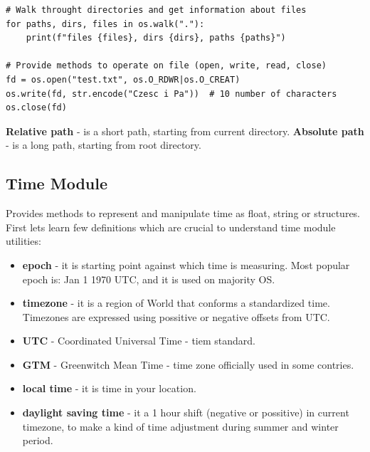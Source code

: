 \documentclass{article}
\begin{document}
\begin{lstlisting}[style=pystyle]
# Walk throught directories and get information about files
for paths, dirs, files in os.walk("."):
    print(f"files {files}, dirs {dirs}, paths {paths}")

# Provide methods to operate on file (open, write, read, close)
fd = os.open("test.txt", os.O_RDWR|os.O_CREAT)
os.write(fd, str.encode("Czesc i Pa"))	# 10 number of characters
os.close(fd)

\end{lstlisting}

\textbf{Relative path} - is a short path, starting from current directory. \textbf{Absolute path} - is a long path, starting from root directory.

\subsection{Time Module} \label{time:0}
Provides methods to represent and manipulate time as float, string or structures. First lets learn few definitions which are crucial to understand time module utilities:
\begin{itemize} \label{time:1}
\item \textbf{epoch} - it is starting point against which time is measuring. Most popular epoch is: Jan 1 1970 UTC, and it is used on majority OS.
\item \textbf{timezone} - it is a region of World that conforms a standardized time. Timezones are expressed using possitive or negative offsets from UTC.
\item \textbf{UTC} - Coordinated Universal Time - tiem standard.
\item \textbf{GTM} - Greenwitch Mean Time - time zone officially used in some contries.
\item \textbf{local time} - it is time in your location.
\item \textbf{daylight saving time} - it a 1 hour shift (negative or possitive) in current timezone, to make a kind of time adjustment during summer and winter period.
\end{itemize}
\end{document}

